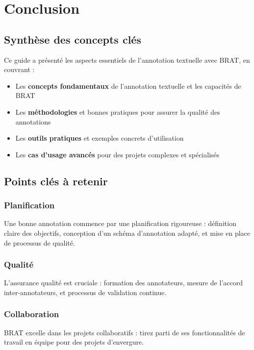 
\section{Conclusion}

\subsection{Synthèse des concepts clés}

Ce guide a présenté les aspects essentiels de l'annotation textuelle avec BRAT, en couvrant :

\begin{itemize}
    \item Les \textbf{concepts fondamentaux} de l'annotation textuelle et les capacités de BRAT
    \item Les \textbf{méthodologies} et bonnes pratiques pour assurer la qualité des annotations
    \item Les \textbf{outils pratiques} et exemples concrets d'utilisation
    \item Les \textbf{cas d'usage avancés} pour des projets complexes et spécialisés
\end{itemize}

\subsection{Points clés à retenir}

\subsubsection{Planification}
Une bonne annotation commence par une planification rigoureuse : définition claire des objectifs, conception d'un schéma d'annotation adapté, et mise en place de processus de qualité.

\subsubsection{Qualité}
L'assurance qualité est cruciale : formation des annotateurs, mesure de l'accord inter-annotateurs, et processus de validation continue.

\subsubsection{Collaboration}
BRAT excelle dans les projets collaboratifs : tirez parti de ses fonctionnalités de travail en équipe pour des projets d'envergure.

